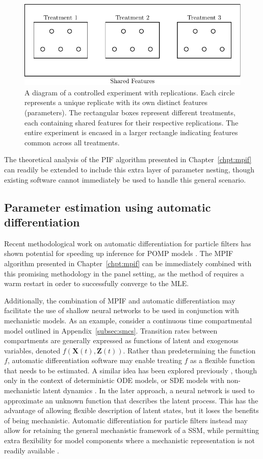 \begin{figure}[h!]
    \centering
    \includegraphics[width=0.7\linewidth]{chapters/conclusion/nestedDesign.pdf}
    \caption[A diagram of a controlled experiment with replications.]{A diagram of a controlled experiment with replications. Each circle represents a unique replicate with its own distinct features (parameters). The rectangular boxes represent different treatments, each containing shared features for their respective replications. The entire experiment is encased in a larger rectangle indicating features common across all treatments.}
    \label{fig:controlled_experiment}
\end{figure}

The theoretical analysis of the PIF algorithm presented in Chapter~\ref{chpt:mpif} can readily be extended to include this extra layer of parameter nesting, though existing software cannot immediately be used to handle this general scenario.

\subsection*{Parameter estimation using automatic differentiation}

Recent methodological work on automatic differentiation for particle filters has shown potential for speeding up inference for POMP models \citep{tan24}.
The MPIF algorithm presented in Chapter~\ref{chpt:mpif} can be immediately combined with this promising methodology in the panel setting, as the method of \citet{tan24} requires a warm restart in order to successfully converge to the MLE.

Additionally, the combination of MPIF and automatic differentiation may facilitate the use of shallow neural networks to be used in conjunction with mechanistic models.
As an example, consider a continuous time compartmental model outlined in Appendix~\ref{subsec:smcs}.
Transition rates between compartments are generally expressed as functions of latent and exogenous variables, denoted $f(\bm{X}(t), \bm{Z}(t))$.
Rather than predetermining the function $f$, automatic differentiation software may enable treating $f$ as a flexible function that needs to be estimated.
A similar idea has been explored previously \citep{noordijk24,dandekar20}, though only in the context of deterministic ODE models, or SDE models with non-mechanistic latent dynamics \citep{lin24}.
In the later approach, a neural network is used to approximate an unknown function that describes the latent process. 
This has the advantage of allowing flexible description of latent states, but it loses the benefits of being mechanistic.
Automatic differentiation for particle filters instead may allow for retaining the general mechanistic framework of a SSM, while permitting extra flexibility for model components where a mechanistic representation is not readily available \citep{dandekar20}. 

